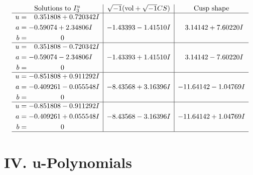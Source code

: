 \documentclass[1p]{elsarticle_modified}
\theoremstyle{definition}
\newcommand{\I}{\sqrt{-1}}
\begin{document}
$$\begin{array}{c|c|c}  
\text{Solutions to }I^u_{3}& \I (\text{vol} + \sqrt{-1}CS) & \text{Cusp shape}\\
 \hline 
\begin{aligned}
u &= \phantom{-}0.351808 + 0.720342 I \\
a &= -0.59074 + 2.34806 I \\
b &= \phantom{-0.000000 } 0\end{aligned}
 & -1.43393 - 1.41510 I & \phantom{-}3.14142 + 7.60220 I \\ \hline\begin{aligned}
u &= \phantom{-}0.351808 - 0.720342 I \\
a &= -0.59074 - 2.34806 I \\
b &= \phantom{-0.000000 } 0\end{aligned}
 & -1.43393 + 1.41510 I & \phantom{-}3.14142 - 7.60220 I \\ \hline\begin{aligned}
u &= -0.851808 + 0.911292 I \\
a &= -0.409261 - 0.055548 I \\
b &= \phantom{-0.000000 } 0\end{aligned}
 & -8.43568 + 3.16396 I & -11.64142 - 1.04769 I \\ \hline\begin{aligned}
u &= -0.851808 - 0.911292 I \\
a &= -0.409261 + 0.055548 I \\
b &= \phantom{-0.000000 } 0\end{aligned}
 & -8.43568 - 3.16396 I & -11.64142 + 1.04769 I\\
 \hline 
 \end{array}$$\newpage
\newpage\renewcommand{\arraystretch}{1}
\centering \section*{ IV. u-Polynomials}
\end{document}
